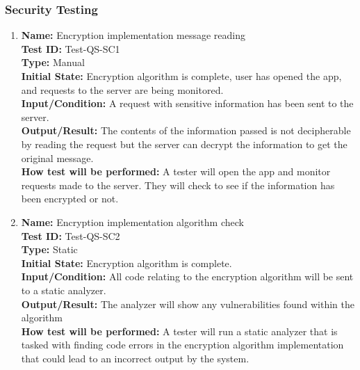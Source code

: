 \documentclass[12pt, titlepage]{article}
\begin{document}
\subsubsection{Security Testing}

\begin{enumerate}

    \item
    \textbf{Name:} Encryption implementation message reading \label{itm:Test-QS-SC1} \\
    \textbf{Test ID:} Test-QS-SC1 \\
    \textbf{Type:} Manual \\
    \textbf{Initial State:} Encryption algorithm is complete, user has opened the app, and requests to the server are being monitored. \\
    \textbf{Input/Condition:} A request with sensitive information has been sent to the server. \\
    \textbf{Output/Result:} The contents of the information passed is not decipherable by reading the request but the server can decrypt the information to get the original message. \\
    \textbf{How test will be performed:} A tester will open the app and monitor requests made to the server. They will check to see if the information has been encrypted or not.

    \item
    \textbf{Name:} Encryption implementation algorithm check \label{itm:Test-QS-SC2} \\
    \textbf{Test ID:} Test-QS-SC2 \\
    \textbf{Type:} Static \\
    \textbf{Initial State:} Encryption algorithm is complete. \\
    \textbf{Input/Condition:} All code relating to the encryption algorithm will be sent to a static analyzer. \\
    \textbf{Output/Result:} The analyzer will show any vulnerabilities found within the algorithm \\
    \textbf{How test will be performed:} A tester will run a static analyzer that is tasked with finding code errors in the encryption algorithm implementation that could lead to an incorrect output by the system.


\end{enumerate}
\end{document}
